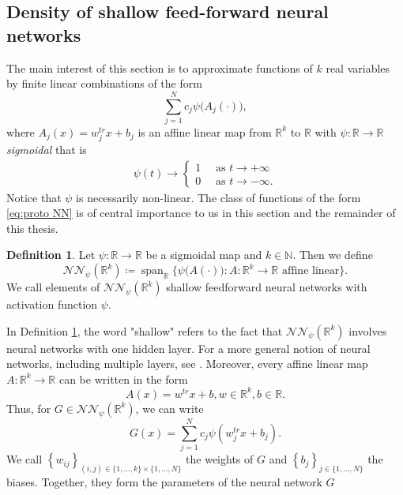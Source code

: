 \documentclass[11pt,a4paper,twoside,openany]{report}
\numberwithin{equation}{section}
\theoremstyle{plain} %
\theoremstyle{definition} %
\newtheorem{definition}[theorem]{Definition}
\theoremstyle{remark} %
\let\parencite\authnumparencite
\begin{document}
\subsection{Density of shallow feed-forward neural networks}
The main interest of this section is to approximate functions of \(k\) real variables by finite linear combinations of the form 
\begin{equation}\label{eq:proto NN}
    \sum_{j=1}^Nc_j\psi\big(A_j(\cdot)\big),
\end{equation}
where \(A_j(x)=w_j^{tr}x+b_j\) is an affine linear map from \(\mathbb{R}^k\) to \(\mathbb{R}\) with \(\psi:\mathbb{R}\to\mathbb{R}\) \textit{sigmoidal} that is
\begin{align*}
\psi(t)\to
    \begin{cases}
    1\quad\text{ as } t\to +\infty\\
    0\quad\text{ as } t\to -\infty.
    \end{cases}
\end{align*}
Notice that \(\psi\) is necessarily non-linear. 
The class of functions of the form \eqref{eq:proto NN} is of central importance to us in this section and the remainder of this thesis.
\begin{definition}\label{def:shallow feedforward neural networks}
    Let \(\psi:\mathbb{R}\to\mathbb{R}\) be a sigmoidal map and \(k\in\mathbb{N}\). Then we define
    \begin{equation*}
        \mathcal{NN}_{\psi}(\mathbb{R}^k)\coloneqq\operatorname{span}_{\mathbb{R}}\Big\{\psi\big(A(\cdot)\big):A:\mathbb{R}^k\to\mathbb{R}\text{ affine linear}\Big\}.
    \end{equation*}
    We call elements of \(\mathcal{NN}_{\psi}(\mathbb{R}^k)\) shallow feedforward neural networks with activation function \(\psi\).
\end{definition}
In Definition \ref{def:shallow feedforward neural networks}, the word "shallow" refers to the fact that \(\mathcal{NN}_{\psi}(\mathbb{R}^k)\) involves neural networks with one hidden layer. 
For a more general notion of neural networks, including multiple layers, see \parencite[Def.~4.1]{Buehler2018DeepHedging}.
Moreover, every affine linear map \(A:\mathbb{R}^k\to\mathbb{R}\) can be written in the form 
\begin{equation*}
    A(x)=w^{tr}x+b, w\in\mathbb{R}^k,b\in\mathbb{R}.
\end{equation*}
Thus, for \(G\in \mathcal{NN}_{\psi}(\mathbb{R}^k)\), we can write
\begin{equation*}
    G(x)=\sum_{j=1}^Nc_j\psi(w_j^{tr}x+b_j).
\end{equation*}
We call \(\left\{w_{ij}\right\}_{(i,j)\in\{1,\dots,k\}\times\{1,\dots,N\}}\) the weights of \(G\) and \(\left\{b_{j}\right\}_{j\in \{1,\dots,N\}}\) the biases. Together, they form the parameters of the neural network \(G\)
\end{document}
